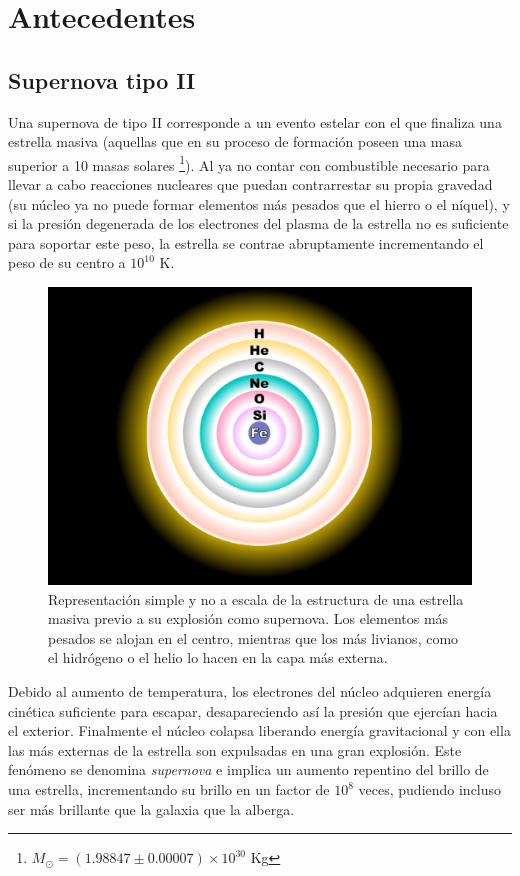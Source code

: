 \chapter{Antecedentes}
\label{ch:background}

\section{Supernova tipo II}\label{sec:sn}
Una supernova de tipo II corresponde a un evento estelar con el que finaliza una estrella masiva (aquellas que en su proceso de formaci\'on poseen una masa superior a 10 masas solares \footnote{$M_{\odot} = (1.98847 \pm 0.00007) \times 10^{30}$ Kg}). Al ya no contar con combustible necesario para llevar a cabo reacciones nucleares que puedan contrarrestar su propia gravedad (su n\'ucleo ya no puede formar elementos m\'as pesados que el hierro o el n\'iquel), y si la presi\'on degenerada de los electrones del plasma de la estrella no es suficiente para soportar este peso, la estrella se contrae abruptamente incrementando el peso de su centro a $10^{10}$ K.
\bigskip

\begin{figure}[h!]
\centering
\includegraphics[scale=.25]{images/sncore}
\caption{Representaci\'on simple y no a escala de la estructura de una estrella masiva previo a su explosi\'on como supernova. Los elementos m\'as pesados se alojan en el centro, mientras que  los m\'as livianos, como el hidr\'ogeno o el helio lo hacen en la capa m\'as externa.}
\label{fig:f0}
\end{figure}


Debido al aumento de temperatura, los electrones del n\'ucleo adquieren energ\'ia cin\'etica suficiente para escapar, desapareciendo as\'i la presi\'on que ejerc\'ian hacia el exterior. Finalmente el n\'ucleo colapsa liberando energ\'ia gravitacional y con ella las m\'as externas de la estrella son expulsadas en una gran explosi\'on. Este fen\'omeno se denomina \textit{supernova} e implica un aumento repentino del brillo de una estrella, incrementando su brillo en un factor de $10^8$ veces, pudiendo incluso ser m\'as brillante que la galaxia que la alberga.
\bigskip

